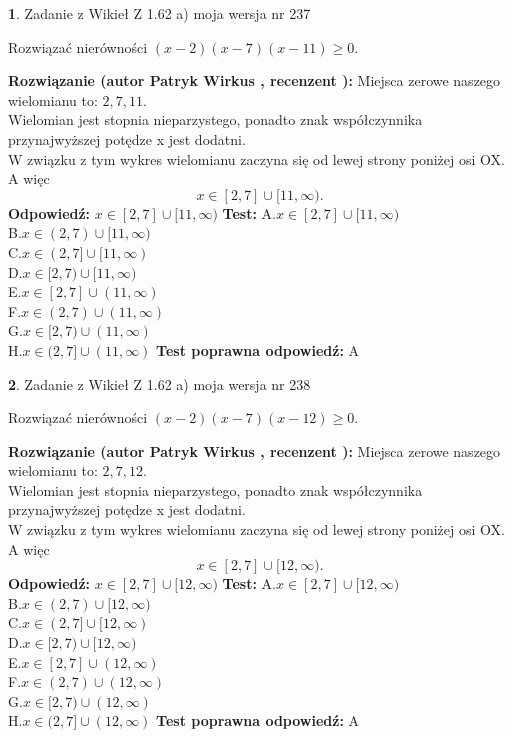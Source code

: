 \documentclass[12pt, a4paper]{article}
\theoremstyle{definition} %
\newtheorem{zad}{}
\newcommand{\zadStart}[1]{\begin{zad}#1\newline}
\newcommand{\zadStop}{\end{zad}}
\newcommand{\rozwStart}[2]{\noindent \textbf{Rozwiązanie (autor #1 , recenzent #2): }\newline}
\newcommand{\rozwStop}{\newline}
\newcommand{\odpStart}{\noindent \textbf{Odpowiedź:}\newline}
\newcommand{\odpStop}{\newline}
\newcommand{\testStart}{\noindent \textbf{Test:}\newline}
\newcommand{\testStop}{\newline}
\newcommand{\kluczStart}{\noindent \textbf{Test poprawna odpowiedź:}\newline}
\newcommand{\kluczStop}{\newline}
\begin{document}
\zadStart{Zadanie z Wikieł Z 1.62 a) moja wersja nr 237}

Rozwiązać nierówności $(x-2)(x-7)(x-11)\ge0$.
\zadStop
\rozwStart{Patryk Wirkus}{}
Miejsca zerowe naszego wielomianu to: $2, 7, 11$.\\
Wielomian jest stopnia nieparzystego, ponadto znak współczynnika przy\linebreak najwyższej potędze x jest dodatni.\\ W związku z tym wykres wielomianu zaczyna się od lewej strony poniżej osi OX. A więc $$x \in [2,7] \cup [11,\infty).$$
\rozwStop
\odpStart
$x \in [2,7] \cup [11,\infty)$
\odpStop
\testStart
A.$x \in [2,7] \cup [11,\infty)$\\
B.$x \in (2,7) \cup [11,\infty)$\\
C.$x \in (2,7] \cup [11,\infty)$\\
D.$x \in [2,7) \cup [11,\infty)$\\
E.$x \in [2,7] \cup (11,\infty)$\\
F.$x \in (2,7) \cup (11,\infty)$\\
G.$x \in [2,7) \cup (11,\infty)$\\
H.$x \in (2,7] \cup (11,\infty)$
\testStop
\kluczStart
A
\kluczStop



\zadStart{Zadanie z Wikieł Z 1.62 a) moja wersja nr 238}

Rozwiązać nierówności $(x-2)(x-7)(x-12)\ge0$.
\zadStop
\rozwStart{Patryk Wirkus}{}
Miejsca zerowe naszego wielomianu to: $2, 7, 12$.\\
Wielomian jest stopnia nieparzystego, ponadto znak współczynnika przy\linebreak najwyższej potędze x jest dodatni.\\ W związku z tym wykres wielomianu zaczyna się od lewej strony poniżej osi OX. A więc $$x \in [2,7] \cup [12,\infty).$$
\rozwStop
\odpStart
$x \in [2,7] \cup [12,\infty)$
\odpStop
\testStart
A.$x \in [2,7] \cup [12,\infty)$\\
B.$x \in (2,7) \cup [12,\infty)$\\
C.$x \in (2,7] \cup [12,\infty)$\\
D.$x \in [2,7) \cup [12,\infty)$\\
E.$x \in [2,7] \cup (12,\infty)$\\
F.$x \in (2,7) \cup (12,\infty)$\\
G.$x \in [2,7) \cup (12,\infty)$\\
H.$x \in (2,7] \cup (12,\infty)$
\testStop
\kluczStart
A
\kluczStop
\end{document}
